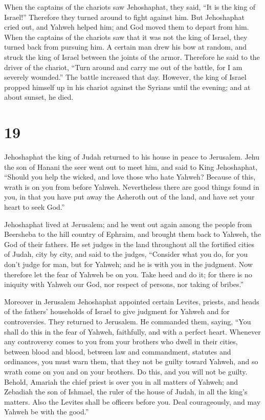  When the captains of the chariots saw Jehoshaphat, they
said, ``It is the king of Israel!'' Therefore they turned around to
fight against him. But Jehoshaphat cried out, and Yahweh helped him; and
God moved them to depart from him.  When the captains of
the chariots saw that it was not the king of Israel, they turned back
from pursuing him.  A certain man drew his bow at random,
and struck the king of Israel between the joints of the armor. Therefore
he said to the driver of the chariot, ``Turn around and carry me out of
the battle, for I am severely wounded.''  The battle
increased that day. However, the king of Israel propped himself up in
his chariot against the Syrians until the evening; and at about sunset,
he died.

\hypertarget{section-18}{%
\section{19}\label{section-18}}

 Jehoshaphat the king of Judah returned to his house in
peace to Jerusalem.  Jehu the son of Hanani the seer went
out to meet him, and said to King Jehoshaphat, ``Should you help the
wicked, and love those who hate Yahweh? Because of this, wrath is on you
from before Yahweh.  Nevertheless there are good things
found in you, in that you have put away the Asheroth out of the land,
and have set your heart to seek God.''

 Jehoshaphat lived at Jerusalem; and he went out again
among the people from Beersheba to the hill country of Ephraim, and
brought them back to Yahweh, the God of their fathers.  He
set judges in the land throughout all the fortified cities of Judah,
city by city,  and said to the judges, ``Consider what you
do, for you don't judge for man, but for Yahweh; and he is with you in
the judgment.  Now therefore let the fear of Yahweh be on
you. Take heed and do it; for there is no iniquity with Yahweh our God,
nor respect of persons, nor taking of bribes.''

 Moreover in Jerusalem Jehoshaphat appointed certain
Levites, priests, and heads of the fathers' households of Israel to give
judgment for Yahweh and for controversies. They returned to Jerusalem.
 He commanded them, saying, ``You shall do this in the
fear of Yahweh, faithfully, and with a perfect heart. 
Whenever any controversy comes to you from your brothers who dwell in
their cities, between blood and blood, between law and commandment,
statutes and ordinances, you must warn them, that they not be guilty
toward Yahweh, and so wrath come on you and on your brothers. Do this,
and you will not be guilty.  Behold, Amariah the chief
priest is over you in all matters of Yahweh; and Zebadiah the son of
Ishmael, the ruler of the house of Judah, in all the king's matters.
Also the Levites shall be officers before you. Deal courageously, and
may Yahweh be with the good.''

